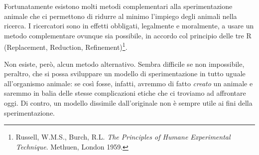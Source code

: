\documentclass[a4paper,11pt,oneside,article]{memoir}
\begin{document}
Fortunatamente esistono molti metodi complementari alla sperimentazione animale
che ci permettono di ridurre al minimo l'impiego degli animali nella ricerca. I
ricercatori sono in effetti obbligati, legalmente e moralmente, a usare un
metodo complementare ovunque sia possibile, in accordo col principio delle tre R
(Replacement, Reduction, Refinement)\footnote{Russell, W.M.S., Burch, R.L.
\emph{The Principles of Humane Experimental Technique}. Methuen, London 1959.}.

Non esiste, però, alcun metodo alternativo. Sembra difficile se non impossibile,
peraltro, che si possa sviluppare un modello di sperimentazione in tutto uguale
all'organismo animale: se così fosse, infatti, avremmo di fatto \emph{creato} un
animale e saremmo in balia delle stesse complicazioni etiche che ci troviamo ad
affrontare oggi. Di contro, un modello dissimile dall'originale non è sempre
utile ai fini della sperimentazione.





\end{document}
